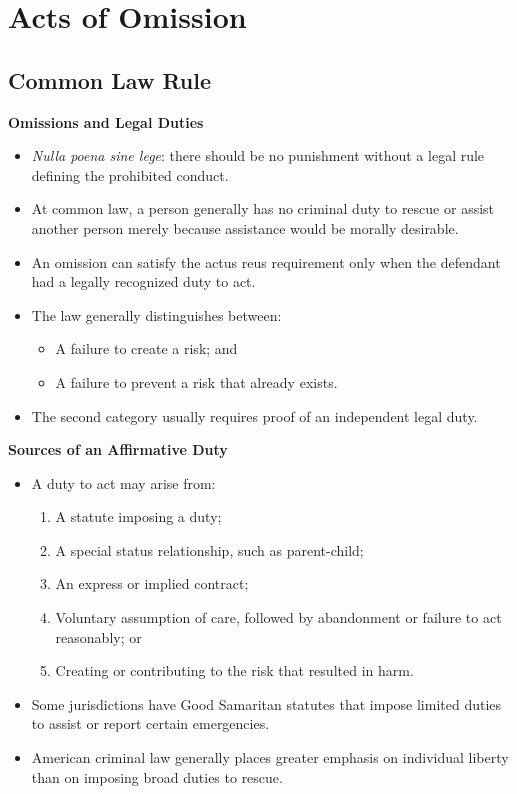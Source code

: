 \documentclass[11pt]{tex/lawoutline}
\begin{document}
\section{Acts of Omission}

\subsection{Common Law Rule}

\textbf{Omissions and Legal Duties}
\begin{itemize}
    \item \textit{Nulla poena sine lege}: there should be no punishment without a legal rule defining the prohibited conduct.
    \item At common law, a person generally has no criminal duty to rescue or assist another person merely because assistance would be morally desirable.
    \item An omission can satisfy the actus reus requirement only when the defendant had a legally recognized duty to act.
    \item The law generally distinguishes between:
    \begin{itemize}
        \item A failure to create a risk; and
        \item A failure to prevent a risk that already exists.
    \end{itemize}
    \item The second category usually requires proof of an independent legal duty.
\end{itemize}


\textbf{Sources of an Affirmative Duty}
\begin{itemize}
    \item A duty to act may arise from:
    \begin{enumerate}
        \item A statute imposing a duty;
        \item A special status relationship, such as parent-child;
        \item An express or implied contract;
        \item Voluntary assumption of care, followed by abandonment or failure to act reasonably; or
        \item Creating or contributing to the risk that resulted in harm.
    \end{enumerate}
    \item Some jurisdictions have Good Samaritan statutes that impose limited duties to assist or report certain emergencies.
    \item American criminal law generally places greater emphasis on individual liberty than on imposing broad duties to rescue.
\end{itemize}
\end{document}
